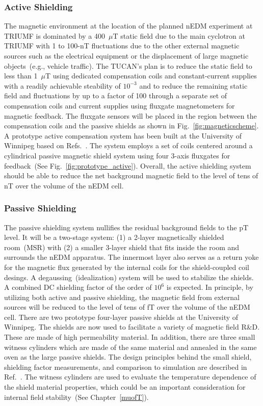 \subsubsection{Active Shielding}

The magnetic environment at the location of the planned nEDM
experiment at TRIUMF is dominated by a 400~$\mu$T static field due to
the main cyclotron at TRIUMF with 1 to 100-nT fluctuations due to the
other external magnetic sources such as the electrical equipment or
the displacement of large magnetic objects~(e.g., vehicle traffic).
The TUCAN's plan is to reduce the static field to less than 1~$\mu$T
using dedicated compensation coils and constant-current supplies with
a readily achievable steability of $10^{-3}$ and to reduce the
remaining static field and fluctuations by up to a factor of 100
through a separate set of compensation coils and current supplies
using fluxgate magnetometers for magnetic feedback. The fluxgate
sensors will be placed in the region between the compensation coils
and the passive shields as shown in Fig.~\ref{fig:magneticscheme}.  A
prototype active compensation system has been built at the University
of Winnipeg based on Refs.~\cite{beatrice,afach2014dynamic}. The
system employs a set of coils centered around a cylindrical passive
magnetic shield system using four 3-axis fluxgates for feedback~(See
Fig.~\ref{fig:prototype_active}). Overall, the active shielding
system should be able to reduce the net background magnetic field to
the level of tens of nT over the volume of the nEDM cell.


\subsubsection{Passive Shielding}
The passive shielding system nullifies the residual background fields
to the pT level. It will be a two-stage system: (1) a 2-layer
magnetically shielded room~(MSR) with (2) a smaller 3-layer shield
that fits inside the room and surrounds the nEDM apparatus. The
innermost layer also serves as a return yoke for the magnetic flux
generated by the internal coils for the shield-coupled coil desings. A
degaussing~(idealization) system will be used to stabilize the
shields. A combined DC shielding factor of the order of $10^6$ is
expected. In principle, by utilizing both active and passive
shielding, the magnetic field from external sources will be reduced to
the level of tens of fT over the volume of the nEDM cell.  There are
two prototype four-layer passive shields at the University of
Winnipeg. The shields are now used to facilitate a variety of magnetic
field R\&D. These are made of high permeability material. In addition,
there are three small witness cylinders which are made of the same
material and annealed in the same oven as the large passive
shields. The design principles behind the small shield, shielding
factor measurements, and comparison to simulation are described in
Ref.~\cite{martin2015large}.  The witness cylinders are used to
evaluate the temperature dependence of the shield material properties,
which could be an important consideration for internal field
stability~(See Chapter~\ref{muofT}).


